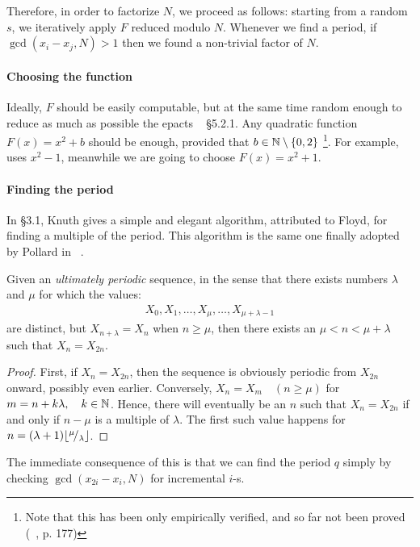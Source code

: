 Therefore, in order to factorize $N$, we proceed as follows: starting from a
random $s$, we iteratively apply $F$ reduced modulo $N$. Whenever we find a
period, if $\gcd(x_i - x_j, N) > 1$ then we found a non-trivial
factor of $N$.

\paragraph{Choosing the function} Ideally, $F$ should be easily computable, but
at the same time random enough to reduce as much as possible the epacts
~\cite{Crandall} \S 5.2.1. Any quadratic function $F(x) = x^2 + b$ should be
enough, provided that $b \in \mathbb{N} \setminus \{0, 2\}$ \footnote{
  Note that this has been only empirically verified, and so far not been proved
  (~\cite{riesel}, p. 177)}.
For example, ~\cite{pollardMC} uses $x^2 -1$, meanwhile we are going to choose
$F(x) = x^2 + 1$.

\paragraph{Finding the period} In \cite{AOCPv2} \S 3.1, Knuth gives a simple and
elegant algorithm, attributed to Floyd, for finding a multiple of the
period. This algorithm is the same one finally adopted by Pollard in
~\cite{pollardMC}.

\begin{theorem*}
Given an \emph{ultimately periodic} sequence, in the sense that there exists
numbers $\lambda$ and $\mu$ for which the values:
\begin{align*}
  X_0, X_1, \ldots, X_{\mu}, \ldots, X_{\mu + \lambda - 1}
\end{align*}
are distinct, but $X_{n+\lambda} = X_n$ when $n \geq \mu$,
then there exists an
$\mu < n < \mu + \lambda$ such that $X_n = X_{2n}$.
\end{theorem*}

\begin{proof}
  First, if $X_n = X_{2n}$, then the sequence is obviously periodic from
  $X_{2n}$ onward, possibly even earlier.
  Conversely, $X_n = X_m \quad (n \geq \mu)$ for
  $m = n + k\lambda, \quad k \in \mathbb{N}$. Hence, there will eventually
  be an $n$ such that $X_n = X_{2n}$ if and only if $n - \mu$ is a multiple of
  $\lambda$.
  The first such value happens for $n = (\lambda + 1)\lfloor{}^{\mu}\!/_{\lambda}\rfloor$.
\end{proof}

The immediate consequence of this is that we can find the period $q$ simply by
checking $\gcd(x_{2i} - x_i, N)$ for incremental $i$-s.

